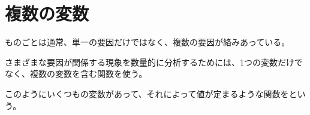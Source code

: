 \documentclass[../../../topic_multivariable-calculus]{subfiles}
\begin{document}
\sectionline
\section{複数の変数}

ものごとは通常、単一の要因だけではなく、複数の要因が絡みあっている。

さまざまな要因が関係する現象を数量的に分析するためには、1つの変数だけでなく、複数の変数を含む関数を使う。

\br

このようにいくつもの変数があって、それによって値が定まるような関数をという。
\end{document}
